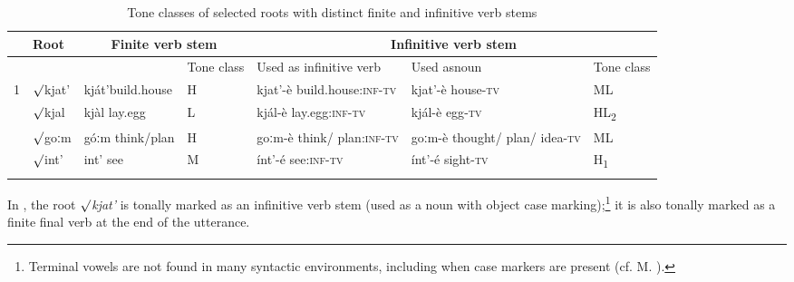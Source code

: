 \documentclass[output=paper]{langsci/langscibook}
\begin{document}
\begin{table}
\caption{Tone classes of selected roots with distinct finite and infinitive verb stems}
\label{tab:mahland:2}
\begin{tabularx}{\textwidth}{l lp{1.5cm}p{.8cm} Xp{1.5cm}p{.8cm}}

\lsptoprule
 & Root & \multicolumn{2}{c}{ Finite verb stem} & \multicolumn{3}{c}{ Infinitive verb stem}\\
\midrule
&  &  & Tone class & Used as \newline infinitive verb & Used as\newline noun\index{Noun} & Tone class\\
\midrule
1 &
 ${\surd}$kjat' &
  kját'\newline build.\newline house &
  H &
  kjat'-è \newline build.house:\textsc{inf-tv} &
  kjat'-è \newline house\textsc{{}-tv} &
  ML
\\
\tablevspace
2 &
  ${\surd}$kjal &
  kjàl \newline lay.egg &
  L &
  kjál-è \newline lay.egg\textsc{:inf-tv} &
  kjál-è \newline  egg\textsc{{}-tv} &
  HL\textsubscript{2}
\\
\tablevspace
3 &
  ${\surd}$goːm &
  góːm \newline  think/plan &
  H &
  goːm-è \newline  think/ plan\textsc{:inf-tv} &
  goːm-è \newline  thought/ plan/ idea\textsc{{}-tv} &
  ML
\\
\tablevspace
4 &
  ${\surd}$int' &
  int' \newline  see &
  M &
  ínt'-é \newline  see\textsc{:inf-tv} &
  ínt'-é \newline  sight\textsc{{}-tv} &
  H\textsubscript{1}\\
\lspbottomrule
\end{tabularx}
\end{table}

In , the root \textit{${\surd}$kjat'} is tonally marked as an infinitive verb stem (used as a noun with object case marking);\footnote{Terminal vowels are not found in many syntactic environments, including when case markers are present (cf. M. \citealt[313]{AhlandM2012}).} it is also tonally marked as a finite final verb at the end of the utterance.  
\end{document}

